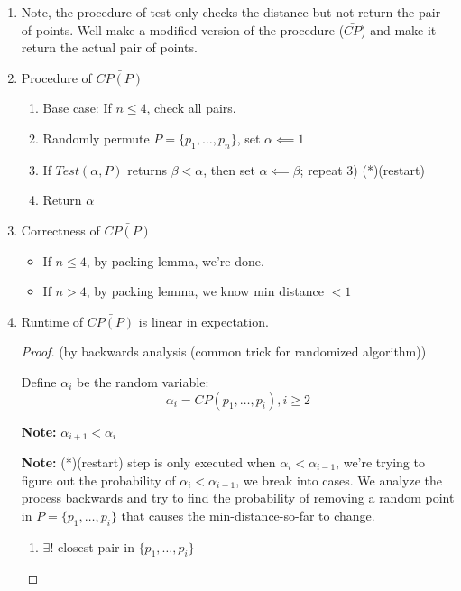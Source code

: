 \documentclass[12pt]{article}
\newcommand{\claim}[1]{\par {\bf Claim }{#1}}
\newcommand{\note}[1]{\par {\bf Note: }{#1}}
\begin{document}
\begin{enumerate}
\begin{enumerate}[1)]
\begin{enumerate}[a)]
      \note{Distance between $p_i$ and points not in $Ext(B)$ must be
        greater than $\alpha$. By packing lemma, there will be at most
        one point in each sub box of the $Ext(B)$}
    \item If $\beta = \alpha$, set $Flag = true$
    \end{enumerate}
  \item If $Flag$ then return $CP(P) = \alpha$ \\Else return
    $CP(P) > \alpha$
  \end{enumerate}
  \claim{Test is linear time and it correctly test if
    $CP(P) \leq \alpha$ and returns the distance if there is one.}
  \item Note, the procedure of test only checks the distance but not
    return the pair of points. Well make a modified version of the
    procedure ($\bar{CP}$) and make it return the actual pair of
    points.
  \item Procedure of $\bar{CP(P)}$
    \begin{enumerate}[1)]
    \item Base case: If $n \leq 4$, check all pairs.
    \item Randomly permute $P = \{p_1, \dots, p_n\}$, set $\alpha
      \impliedby 1$
    \item If $Test(\alpha, P)$ returns $\beta < \alpha$, then set
      $\alpha \impliedby \beta$; repeat 3) (*)(restart)
    \item Return $\alpha$
    \end{enumerate}
  \item Correctness of $\bar{CP(P)}$
    \begin{itemize}
    \item If $n \leq 4$, by packing lemma, we're done.
    \item If $n > 4$, by packing lemma, we know min distance $< 1$
    \end{itemize}
  \item Runtime of $\bar{CP(P)}$ is linear in expectation.
    \begin{proof}(by backwards analysis (common trick for randomized algorithm))

      Define $\alpha_i$ be the random variable:
      $$\alpha_i = CP(p_1, \dots, p_i), i \geq 2$$ 

      \note{$\alpha_{i + 1} < \alpha_i$} 
      \note{(*)(restart) step is only
        executed when $\alpha_i < \alpha_{i - 1}$, we're trying to
        figure out the probability of $\alpha_i < \alpha_{i - 1}$, we
        break into cases. We analyze the process backwards and try to
        find the probability of removing a random point in $P = \{p_1,
        \dots, p_i\}$ that causes the min-distance-so-far to change.}
        \begin{enumerate}[{Case }1.]
        \item $\exists!$ closest pair in $\{p_1, \dots, p_i\}$
          

\end{enumerate}
\end{proof}
\end{enumerate}
\end{document}
